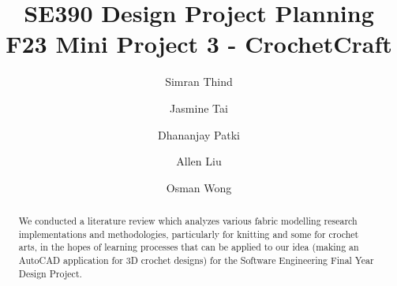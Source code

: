 \documentclass{IEEEcsmag}
\begin{document}

\title{SE390 Design Project Planning F23 Mini Project 3 - CrochetCraft}

\author{Simran Thind}

\author{Jasmine Tai}

\author{Dhananjay Patki}

\author{Allen Liu}

\author{Osman Wong}


\begin{abstract} 
We conducted a literature review which analyzes various fabric modelling research implementations and methodologies, particularly for knitting and some for crochet arts, in the hopes of learning processes that can be applied to our idea (making an AutoCAD application for 3D crochet designs) for the Software Engineering Final Year Design Project.
\end{abstract}

\maketitle
\end{document}
